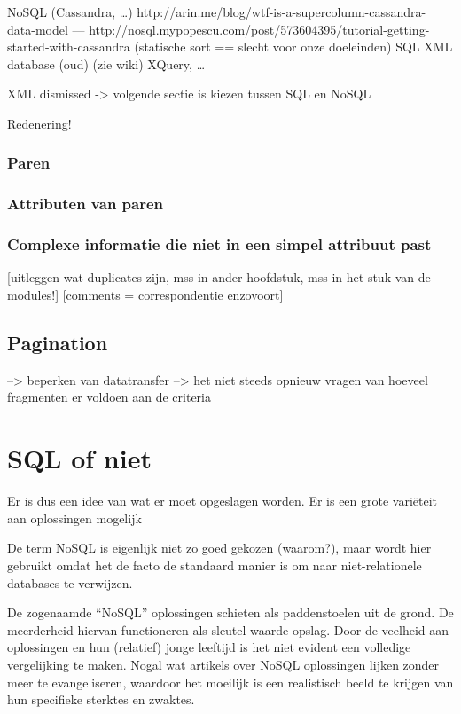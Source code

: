NoSQL (Cassandra, \ldots) http://arin.me/blog/wtf-is-a-supercolumn-cassandra-data-model --- http://nosql.mypopescu.com/post/573604395/tutorial-getting-started-with-cassandra (statische sort == slecht voor onze doeleinden)
SQL
XML database (oud) (zie wiki) XQuery, \ldots

XML dismissed -> volgende sectie is kiezen tussen SQL en NoSQL

Redenering!

\subsubsection{Paren}

\subsubsection{Attributen van paren}

\subsubsection{Complexe informatie die niet in een simpel attribuut past}

[uitleggen wat duplicates zijn, mss in ander hoofdstuk, mss in het stuk van de modules!]
[comments = correspondentie enzovoort]

\subsection{Pagination}

--> beperken van datatransfer
--> het niet steeds opnieuw vragen van hoeveel fragmenten er voldoen aan de criteria

\section{SQL of niet}
Er is dus een idee van wat er moet opgeslagen worden. Er is een grote vari\"eteit aan oplossingen mogelijk

De term NoSQL is eigenlijk niet zo goed gekozen (waarom?), maar wordt hier gebruikt omdat het de facto de standaard manier is om naar niet-relationele databases te verwijzen.

De zogenaamde ``NoSQL'' oplossingen schieten als paddenstoelen uit de grond. De meerderheid hiervan functioneren als sleutel-waarde opslag. Door de veelheid aan oplossingen en hun (relatief) jonge leeftijd is het niet evident een volledige vergelijking te maken. Nogal wat artikels over NoSQL oplossingen lijken zonder meer te evangeliseren, waardoor het moeilijk is een realistisch beeld te krijgen van hun specifieke sterktes en zwaktes.

